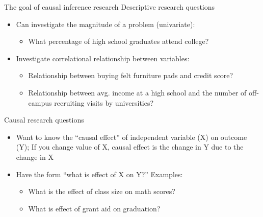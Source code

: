 \begin{frame}{The goal of causal inference research}
	Descriptive research questions
	\begin{itemize}
		\item Can investigate the magnitude of a problem (univariate):
		\begin{itemize}
			\item What percentage of high school graduates attend college?
		\end{itemize}
		\item Investigate correlational relationship between variables:
		\begin{itemize}
			\item Relationship between buying felt furniture pads and credit score?
			\item Relationship between avg. income at a high school and the number of off-campus recruiting visits by universities?
		\end{itemize}		
	\end{itemize}
	\vspace{2mm}	
	Causal research questions
	\begin{itemize}
	\item Want to know the ``causal effect'' of independent variable (X) on outcome (Y); If you change value of X, causal effect is the change in Y due to the change in X
	\item Have the form ``what is effect of X on Y?'' Examples: 
		\begin{itemize}
		\item What is the effect of class size on math scores? 
		\item What is effect of grant aid on graduation?
		\end{itemize} 
	\end{itemize}
\end{frame} 



